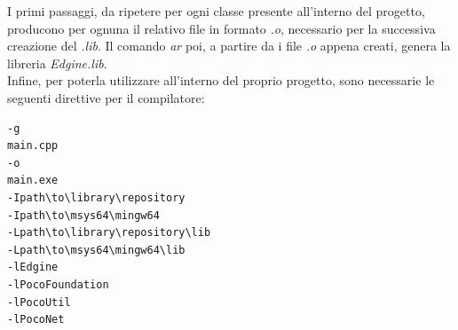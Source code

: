 I primi passaggi, da ripetere per ogni classe presente all'interno del progetto, producono per ognuna il relativo file in formato \textit{.o}, necessario per la successiva creazione del \textit{.lib}. Il comando \textit{ar} poi, a partire da i file \textit{.o} appena creati, genera la libreria \textit{Edgine.lib}.\\
Infine, per poterla utilizzare all'interno del proprio progetto, sono necessarie le seguenti direttive per il compilatore:
\begin{verbatim}
-g
main.cpp
-o
main.exe
-Ipath\to\library\repository
-Ipath\to\msys64\mingw64
-Lpath\to\library\repository\lib
-Lpath\to\msys64\mingw64\lib
-lEdgine
-lPocoFoundation
-lPocoUtil
-lPocoNet
\end{verbatim}









